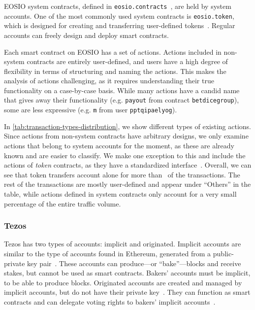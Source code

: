 EOSIO system contracts, defined in \texttt{eosio.contracts}~\cite{EOSIO2020}, are held by system accounts.
One of the most commonly used system contracts is \texttt{eosio.token}, which is designed for creating and transferring user-defined tokens~\cite{EOSIO2019}.
Regular accounts can freely design and deploy smart contracts.

Each smart contract on EOSIO has a set of actions.
Actions included in non-system contracts are entirely user-defined, and users have a high degree of flexibility in terms of structuring and naming the actions.
This makes the analysis of actions challenging, as it requires understanding their true functionality on a case-by-case basis.
While many actions have a candid name that gives away their functionality (e.g. \texttt{payout} from contract \texttt{betdicegroup}), some are less expressive (e.g. \texttt{m} from user \texttt{pptqipaelyog}).

In \autoref{tab:transaction-types-distribution}, we show different types of existing actions.
Since actions from non-system contracts have arbitrary designs, we only examine actions that belong to system accounts for the moment, as these are already known and are easier to classify. We make one exception to this and include the actions of \emph{token} contracts, as they have a standardized interface~\cite{eosio-tokens}.
Overall, we can see that token transfers account alone for more than~ of the transactions. The rest of the transactions are mostly user-defined and appear under ``Others'' in the table, while actions defined in system contracts only account for a very small percentage of the entire traffic volume.



\subsubsection{Tezos}
Tezos has two types of accounts: implicit and originated.
Implicit accounts are similar to the type of accounts found in Ethereum, generated from a public-private key pair~\cite{wood2014}.
These accounts can produce---or ``bake''---blocks and receive stakes, but cannot be used as smart contracts.
Bakers' accounts must be implicit, to be able to produce blocks.
Originated accounts are created and managed by implicit accounts, but do not have their private key~\cite{NomadicLabs2018a}.
They can function as smart contracts and can delegate voting rights to bakers' implicit accounts~\cite{Labs2018}.

